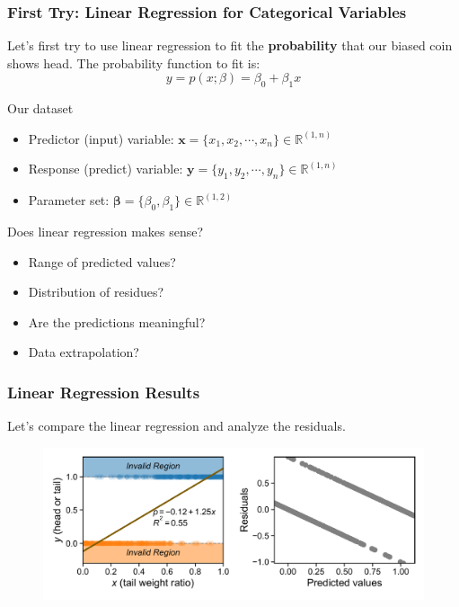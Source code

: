 \documentclass[10pt,aspectratio=169]{beamer}
\begin{document}
\begin{frame}
  \frametitle{First Try: Linear Regression for Categorical Variables}

  Let's first try to use linear regression to fit the
  \textbf{probability} that our biased coin shows head. The
  probability function to fit is:
  \begin{equation*}
    y = p(x; \mathbb{\beta}) = \beta_{0} + \beta_{1} x
  \end{equation*}

  \vfill Our dataset
  \begin{itemize}
  \item Predictor (input) variable:
    $\mathbf{x} = \{x_{1}, x_{2}, \cdots, x_{n}\} \in \mathbb{R}^{(1,
      n)}$
  \item Response (predict) variable:
    $\mathbf{y} = \{y_{1}, y_{2}, \cdots, y_{n}\} \in \mathbb{R}^{(1,
      n)}$
  \item Parameter set:
    $\mathbf{\beta} = \{\beta_{0}, \beta_{1}\} \in \mathbb{R}^{(1,
      2)}$
  \end{itemize}

  \vfill Does linear regression makes sense?
  \begin{itemize}
  \item Range of predicted values?
  \item Distribution of residues?
  \item Are the predictions meaningful?
  \item Data extrapolation?
  \end{itemize}
\end{frame}


\begin{frame}
  \frametitle{Linear Regression Results}
  Let's compare the linear regression and analyze the residuals.
  \begin{figure}
    \centering %
    \hspace*{-0.05\textwidth}%
    \includegraphics[width=1.10\textwidth]{scripts/coin_linear_combined.pdf}
  \end{figure}
\end{frame}
  
\end{document}
